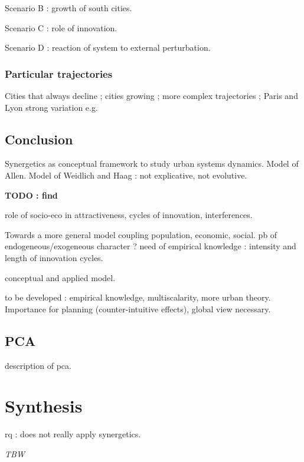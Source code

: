 Scenario B : growth of south cities.

Scenario C : role of innovation.

Scenario D : reaction of system to external perturbation.

\subsubsection{Particular trajectories}

Cities that always decline ; cities growing ; more complex trajectories ; Paris and Lyon strong variation e.g.


\subsection*{Conclusion}


Synergetics as conceptual framework to study urban systems dynamics. Model of Allen. Model of Weidlich and Haag : not explicative, not evolutive.

\textbf{TODO : find } \cite{allen1991evolutionary}

role of socio-eco in attractiveness, cycles of innovation, interferences. 

Towards a more general model coupling population, economic, social. pb of endogeneous/exogeneous character ? need of empirical knowledge : intensity and length of innovation cycles.

conceptual and applied model.

to be developed : empirical knowledge, multiscalarity, more urban theory. Importance for planning (counter-intuitive effects), global view necessary.

\subsection*{PCA}

description of pca.

\section{Synthesis}

rq : does not really apply synergetics.

\textit{TBW}










